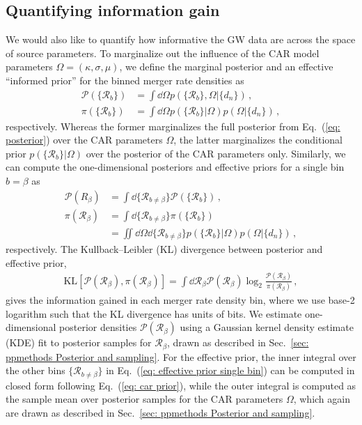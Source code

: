 \begin{refsection}
\subsection{Quantifying information gain}
\label{sec: ppmethods Quantifying information gain} 

We would also like to quantify how informative the GW data are across the space of source parameters. To marginalize out the influence of the CAR model parameters $\Omega=(\kappa,\sigma,\mu)$, we define the marginal posterior and an effective ``informed prior'' for the binned merger rate densities as
\begin{align}
\mathcal{P} ( \{\mathcal{R}_b\} )
& =
\int \dd{\Omega}
p ( \{\mathcal{R}_b\} , \Omega | \{d_n\} )
\, ,
\label{eq: posterior all bins}
\\
\pi ( \{\mathcal{R}_b\} )
& =
\int \dd{\Omega}
p ( \{\mathcal{R}_b\} | \Omega ) p ( \Omega | \{d_n\} )
\label{eq: effective prior all bins}
\, ,
\end{align}
respectively. Whereas the former marginalizes the full posterior from Eq.~(\ref{eq: posterior}) over the CAR parameters $\Omega$, the latter marginalizes the conditional prior $p(\{\mathcal{R}_b\}|\Omega)$ over the posterior of the CAR parameters only. Similarly, we can compute the one-dimensional posteriors and effective priors for a single bin $b=\beta$ as
\begin{align}
\mathcal{P} ( R_\beta )
& =
\int \dd { \{ \mathcal{R}_{b\neq\beta} \} }
\mathcal{P} ( \{ \mathcal{R}_b \} )
\, ,
\label{eq: posterior single bin}
\\
\pi ( \mathcal{R}_\beta )
& =
\int \dd { \{ \mathcal{R}_{b\neq\beta} \} }
\pi ( \{ \mathcal{R}_b \} )
\nonumber \\
& =
\iint \dd{\Omega} \dd { \{ \mathcal{R}_{b\neq\beta} \} }
p ( \{\mathcal{R}_b\} | \Omega ) p ( \Omega | \{d_n\} )
\, ,
\label{eq: effective prior single bin}
\end{align}
respectively. The Kullback--Leibler (KL) divergence between posterior and effective prior,
\begin{align}
\mathrm{KL} [ \mathcal{P}(\mathcal{R}_\beta) , \pi(\mathcal{R}_\beta) ]
=
\int \dd{\mathcal{R}_\beta}
\mathcal{P}(\mathcal{R}_\beta)
\log_2 \frac
{ \mathcal{P}(\mathcal{R}_\beta) }
{ \pi(\mathcal{R}_\beta) }
\, ,
\label{eq: kl}
\end{align}
gives the information gained in each merger rate density bin, where we use base-2 logarithm such that the KL divergence has units of bits. We estimate one-dimensional posterior densities $\mathcal{P}(\mathcal{R}_\beta)$ using a Gaussian kernel density estimate (KDE) fit to posterior samples for $\mathcal{R}_\beta$, drawn as described in Sec.~\ref{sec: ppmethods Posterior and sampling}. For the effective prior, the inner integral over the other bins $\{\mathcal{R}_{b\neq\beta}\}$ in Eq.~(\ref{eq: effective prior single bin}) can be computed in closed form following Eq.~(\ref{eq: car prior}), while the outer integral is computed as the sample mean over posterior samples for the CAR parameters $\Omega$, which again are drawn as described in Sec.~\ref{sec: ppmethods Posterior and sampling}.


\end{refsection}
